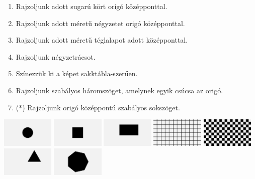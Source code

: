 \progfeladatok

\begin{enumerate}[resume]
  \item Rajzoljunk adott sugarú kört origó középponttal.
  \item Rajzoljunk adott méretű négyzetet origó középponttal.
  \item Rajzoljunk adott méretű téglalapot adott középponttal.
  \item Rajzoljunk négyzetrácsot.
  \item Színezzük ki a képet sakktábla-szerűen.
  \item Rajzoljunk szabályos háromszöget, amelynek egyik csúcsa az origó.
  \item (*) Rajzoljunk origó középpontú szabályos sokszöget.
\end{enumerate}

\begin{center}
  \includegraphics[width=2.5cm]{images/f06.png}\hfill
  \includegraphics[width=2.5cm]{images/f07.png}\hfill
  \includegraphics[width=2.5cm]{images/f08.png}\hfill
  \includegraphics[width=2.5cm]{images/f09.png}\hfill
  \includegraphics[width=2.5cm]{images/f10.png}\hfill
  \includegraphics[width=2.5cm]{images/f11.png}\hfill
  \includegraphics[width=2.5cm]{images/f12.png}
\end{center}

